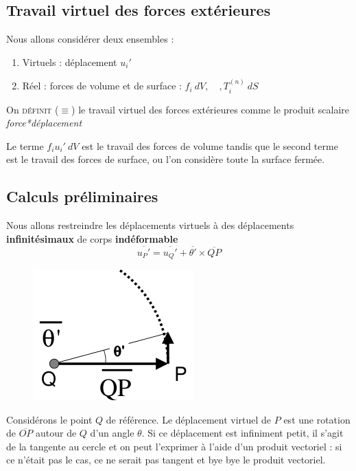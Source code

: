 	
	\subsection{Travail virtuel des forces extérieures}
	Nous allons considérer deux ensembles :
	\begin{enumerate}
	\item Virtuels : déplacement $u_i'$
	\item Réel : forces de volume et de surface : $f_i\ dV,\quad, T_i^{(n)}\ dS$
	\end{enumerate}
	On \textsc{définit} ($\equiv$) le travail virtuel des forces extérieures comme 
	le produit scalaire \textit{force*déplacement}
	\ 
	
	Le terme $f_iu_i'\ dV$ est le travail des forces de volume tandis que le second 
	terme est le travail des forces de surface, ou l'on considère toute la surface 
	fermée.


	\subsection{Calculs préliminaires}
	Nous allons restreindre les déplacements virtuels à des déplacements 
	\textbf{infinitésimaux} de corps \textbf{indéformable} 
	\begin{equation}
	\overline{u_P'} = \overline{u_Q'} + \overline{\theta'}\times\overline{QP}
	\end{equation}
	\begin{figure}
	\vspace{-5mm}
	\includegraphics[scale=0.4]{ch8/image1.png}
	\end{figure}
	Considérons le point $Q$ de référence. Le déplacement virtuel de $P$ est 
	une rotation de $\overline{OP}$ autour de $Q$ d'un angle $\theta$. Si 
	ce déplacement est infiniment petit, il s'agit de la tangente au cercle et 
	on peut l'exprimer à l'aide d'un produit vectoriel : si ce n'était pas le 
	cas, ce ne serait pas tangent et bye bye le produit vectoriel.\\
	
